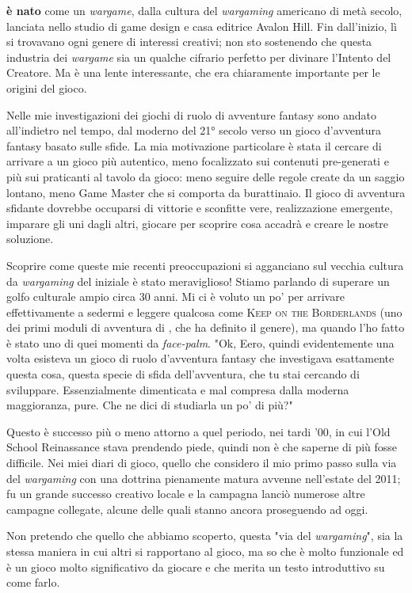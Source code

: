 \textbf{\dnd è nato} come un \textit{wargame}, dalla cultura del \textit{wargaming} americano di metà secolo, lanciata nello studio di game design e casa editrice Avalon Hill. Fin dall'inizio, lì si trovavano ogni genere di interessi creativi; non sto sostenendo che questa industria dei \textit{wargame} sia un qualche cifrario perfetto per divinare l'Intento del Creatore. Ma è una lente interessante, che era chiaramente importante per le origini del gioco.

Nelle mie investigazioni dei giochi di ruolo di avventure fantasy sono andato all'indietro nel tempo, dal moderno \dnd del 21° secolo verso un gioco d'avventura fantasy basato sulle sfide. La mia motivazione particolare è stata il cercare di arrivare a un gioco più autentico, meno focalizzato sui contenuti pre-generati e più sui praticanti al tavolo da gioco: meno seguire delle regole create da un saggio lontano, meno Game Master che si comporta da burattinaio. Il gioco di avventura sfidante dovrebbe occuparsi di vittorie e sconfitte vere, realizzazione emergente, imparare gli uni dagli altri, giocare per scoprire cosa accadrà e creare le nostre soluzione.

Scoprire come queste mie recenti preoccupazioni si agganciano sul vecchia cultura da \textit{wargaming} del \dnd iniziale è stato meraviglioso! Stiamo parlando di superare un golfo culturale ampio circa 30 anni. Mi ci è voluto un po' per arrivare effettivamente a sedermi e leggere qualcosa come \textsc{Keep on the Borderlands} (uno dei primi moduli di avventura di \dnd, che ha definito il genere), ma quando l'ho fatto è stato uno di quei momenti da \textit{face-palm}. "Ok, Eero, quindi evidentemente una volta esisteva un gioco di ruolo d'avventura fantasy che investigava esattamente questa cosa, questa specie di sfida dell'avventura, che tu stai cercando di sviluppare. Essenzialmente dimenticata e mal compresa dalla moderna maggioranza, pure. Che ne dici di studiarla un po' di più?"

Questo è successo più o meno attorno a quel periodo, nei tardi '00, in cui l'Old School Reinassance stava prendendo piede, quindi non è che saperne di più fosse difficile. Nei miei diari di gioco, quello che considero il mio primo passo sulla via del \textit{wargaming} con una dottrina pienamente matura avvenne nell'estate del 2011; fu un grande successo creativo locale e la campagna lanciò numerose altre campagne collegate, alcune delle quali stanno ancora proseguendo ad oggi.

Non pretendo che quello che abbiamo scoperto, questa "via del \textit{wargaming}", sia la stessa maniera in cui altri si rapportano al gioco, ma so che è molto funzionale ed è un gioco molto significativo da giocare e che merita un testo introduttivo su come farlo.